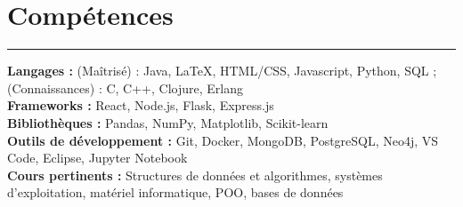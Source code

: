 \documentclass[10pt]{article}
\begin{document}
\section*{Compétences}
\vspace{-2mm}
\hrule
\vspace{0mm}
\textbf{Langages :} (Maîtrisé) : Java, LaTeX, HTML/CSS, Javascript, Python, SQL ; (Connaissances) : C, C++, Clojure, Erlang \\
\textbf{Frameworks :} React, Node.js, Flask, Express.js  \\
\textbf{Bibliothèques :} Pandas, NumPy, Matplotlib, Scikit-learn \\
\textbf{Outils de développement :} Git, Docker, MongoDB, PostgreSQL, Neo4j, VS Code, Eclipse, Jupyter Notebook \\
\textbf{Cours pertinents :} Structures de données et algorithmes, systèmes d'exploitation, matériel informatique, POO, bases de données
\end{document}
